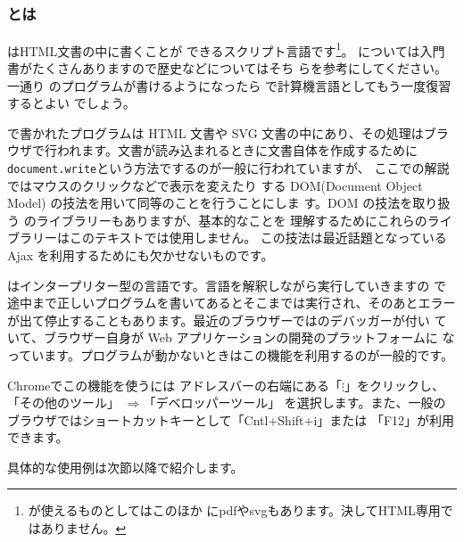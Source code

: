 \subsection{\keyitem{\JS }}
\subsubsection{\JS とは}
\JS はHTML文書の中に書くことが
できるスクリプト言語です\footnote{\JS が使えるものとしてはこのほか
にpdfやsvgもあります。決してHTML専用ではありません。}。
\JS  については入門書がたくさんありますので歴史などについてはそち
らを参考にしてください。一通り \JS のプログラムが書けるようになったら
\appendixname \cite{JavaScript} で計算機言語としてもう一度復習するとよい
でしょう。

\JS で書かれたプログラムは HTML 文書や SVG 文書の中にあり、その処理はブラ
ウザで行われます。文書が読み込まれるときに文書自体を作成するために
\texttt{document.write}という方法でするのが一般に行われていますが、
ここでの解説ではマウスのクリックなどで表示を変えたり
する DOM(Document Object Model) の技法を用いて同等のことを行うことにしま
す。DOM の技法を取り扱う \JS のライブラリーもありますが、基本的なことを
理解するためにこれらのライブラリーはこのテキストでは使用しません。
この技法は最近話題となっている Ajax を利用するためにも欠かせないものです。
\iffalse
この観点から \JS ではセキュリティを保つために動作して
いるコンピュータ上のファイルを読み出したり、書き込むことはできま
せん(ファイルのアップロ－ドは例外です)。

クライアント側のデータを保存するためには一度サーバー側に保存したい
データを送り返してもらうしか方法がありません。
\fi

\JS はインタープリター型の言語です。言語を解釈しながら実行していきますの
で途中まで正しいプログラムを書いてあるとそこまでは実行され、そのあとエラー
が出て停止することもあります。最近のブラウザーでは\JS のデバッガーが付い
ていて、ブラウザー自身が Web アプリケーションの開発のプラットフォームに
なっています。プログラムが動かないときはこの機能を利用するのが一般的です。

Chromeでこの機能を使うには
アドレスバーの右端にある「$\vdots$」をクリックし、「その他のツール」
			$\Rightarrow$「デベロッパーツール」
を選択します。また、一般のブラウザではショートカットキーとして「Cntl+Shift+i」または
「F12」が利用できます。

具体的な使用例は次節以降で紹介します。



